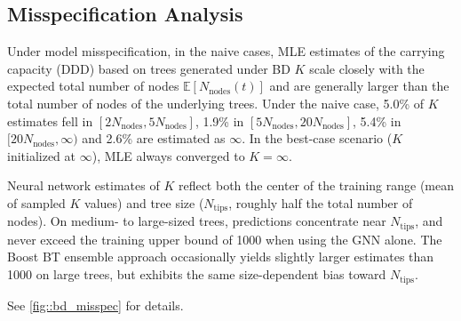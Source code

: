{\subsection{Misspecification Analysis}
\label{ch2::sec::results::misspec}
Under model misspecification, in the naive cases, MLE estimates of the carrying capacity (DDD) based on trees generated under BD $K$ scale closely with the expected total number of nodes $\mathbb{E}[N_{\mathrm{nodes}}(t)]$ and are generally larger than the total number of nodes of the underlying trees. Under the naive case, 5.0\% of $K$ estimates fell in $[2N_{\mathrm{nodes}},5N_{\mathrm{nodes}}]$, 1.9\% in $[5N_{\mathrm{nodes}},20N_{\mathrm{nodes}}]$, 5.4\% in $[20N_{\mathrm{nodes}},\infty)$ and 2.6\% are estimated as $\infty$. In the best-case scenario ($K$ initialized at $\infty$), MLE always converged to $K=\infty$.

Neural network estimates of $K$ reflect both the center of the training range (mean of sampled $K$ values) and tree size ($N_{\mathrm{tips}}$, roughly half the total number of nodes). On medium- to large-sized trees, predictions concentrate near $N_{\mathrm{tips}}$, and never exceed the training upper bound of 1000 when using the GNN alone. The Boost BT ensemble approach occasionally yields slightly larger estimates than 1000 on large trees, but exhibits the same size-dependent bias toward $N_{\mathrm{tips}}$.

See \autoref{fig::bd_misspec} for details.

}

